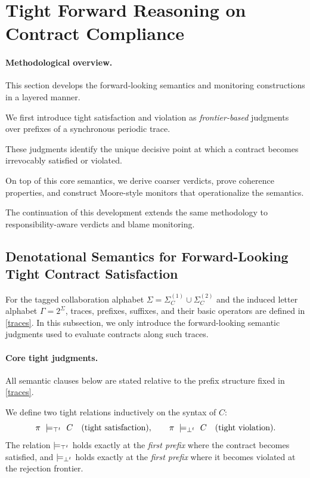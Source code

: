 \section{Tight Forward Reasoning on Contract Compliance}

\paragraph{Methodological overview.}
This section develops the forward-looking semantics and monitoring constructions in a layered manner.

We first introduce tight satisfaction and violation as \emph{frontier-based} judgments over prefixes of a synchronous periodic trace.

These judgments identify the unique decisive point at which a contract becomes irrevocably satisfied or violated.

On top of this core semantics, we derive coarser verdicts, prove coherence properties, and construct Moore-style monitors that operationalize the semantics.

The continuation of this development extends the same methodology to responsibility-aware verdicts and blame monitoring.

\subsection{Denotational Semantics for Forward-Looking Tight Contract Satisfaction}\label{forwardsatsem}

For the tagged collaboration alphabet $\Sigma = \Sigma_C^{(1)} \cup \Sigma_C^{(2)}$ and the induced letter alphabet $\Gamma = 2^{\Sigma}$, traces, prefixes, suffixes, and their basic operators are defined in \ref{traces}.
In this subsection, we only introduce the forward-looking semantic judgments used to evaluate contracts along such traces.

\paragraph{Core tight judgments.}

All semantic clauses below are stated relative to the prefix structure fixed in \ref{traces}.

We define two tight relations inductively on the syntax of $C$:
\[
\pi\ \models_{\top^t}\ C \quad\text{(tight satisfaction)},\qquad
\pi\ \models_{\bot^t}\ C \quad\text{(tight violation)}.
\]
The relation $\models_{\top^t}$ holds exactly at the \emph{first prefix}
where the contract becomes satisfied,
and $\models_{\bot^t}$ holds exactly at the \emph{first prefix}
where it becomes violated at the rejection frontier.
